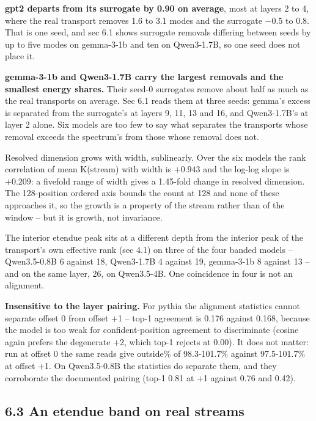 \documentclass[10pt,letterpaper,twocolumn]{article}
\begin{document}
\textbf{gpt2 departs from its surrogate by 0.90 on average}, most at layers 2 to 4, where the real
transport removes 1.6 to 3.1 modes and the surrogate \(-0.5\) to \(0.8\). That is one seed, and sec 6.1
shows surrogate removals differing between seeds by up to five modes on gemma-3-1b and ten on
Qwen3-1.7B, so one seed does not place it.

\textbf{gemma-3-1b and Qwen3-1.7B carry the largest removals and the smallest energy shares.} Their
seed-0 surrogates remove about half as much as the real transports on average. Sec 6.1 reads them
at three seeds: gemma's excess is separated from the surrogate's at layers 9, 11, 13 and 16, and
Qwen3-1.7B's at layer 2 alone. Six models are too few to say what separates the transports whose removal exceeds the
spectrum's from those whose removal does not.

Resolved dimension grows with width, sublinearly. Over the six models the rank correlation of mean
K(stream) with width is \(+0.943\) and the log-log slope is \(+0.209\): a fivefold range of width gives
a 1.45-fold change in resolved dimension. The 128-position ordered axis bounds the count at 128 and
none of these approaches it, so the growth is a property of the stream rather than of the window --
but it is growth, not invariance.

The interior etendue peak sits at a different depth from the interior peak of the transport's own
effective rank (sec 4.1) on three of the four banded models -- Qwen3.5-0.8B 6 against 18, Qwen3-1.7B
4 against 19, gemma-3-1b 8 against 13 -- and on the same layer, 26, on Qwen3.5-4B. One coincidence
in four is not an alignment.

\textbf{Insensitive to the layer pairing.} For pythia the alignment statistics cannot separate offset 0 from offset +1 -- top-1 agreement is 0.176 against 0.168, because the model is too weak for confident-position agreement to discriminate (cosine again prefers the degenerate +2, which top-1 rejects at 0.00). It does not matter: run at offset 0 the same reads give outside\% of 98.3-101.7\% against 97.5-101.7\% at offset +1. On Qwen3.5-0.8B the statistics do separate them, and they corroborate the documented pairing (top-1 0.81 at +1 against 0.76 and 0.42).

\subsection{6.3 An etendue band on real streams}\label{63-an-etendue-band-on-real-streams}
\end{document}
